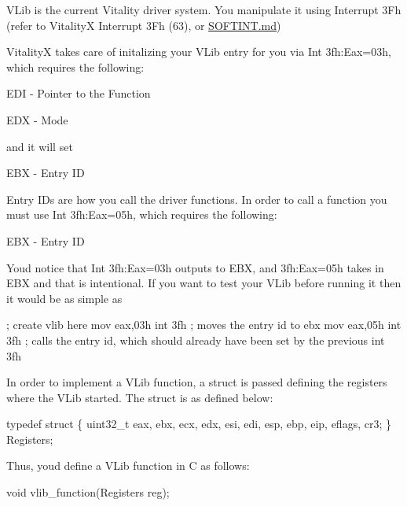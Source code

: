 V\+Lib is the current Vitality driver system. You manipulate it using Interrupt 3\+Fh (refer to VitalityX Interrupt 3\+Fh (63), or \hyperlink{a00008}{S\+O\+F\+T\+I\+N\+T.\+md})

VitalityX takes care of initalizing your V\+Lib entry for you via Int 3fh\+:Eax=03h, which requires the following\+:


\begin{DoxyItemize}
\item E\+DI -\/ Pointer to the Function
\item E\+DX -\/ Mode
\end{DoxyItemize}

and it will set


\begin{DoxyItemize}
\item E\+BX -\/ Entry ID
\end{DoxyItemize}

Entry ID\textquotesingle{}s are how you call the driver functions. In order to call a function you must use Int 3fh\+:Eax=05h, which requires the following\+:


\begin{DoxyItemize}
\item E\+BX -\/ Entry ID
\end{DoxyItemize}

You\textquotesingle{}d notice that Int 3fh\+:Eax=03h outputs to E\+BX, and 3fh\+:Eax=05h takes in E\+BX and that is intentional. If you want to test your V\+Lib before running it then it would be as simple as 
\begin{DoxyCode}
; create vlib here
mov eax,03h
int 3fh ; moves the entry id to ebx
mov eax,05h
int 3fh ; calls the entry id, which should already have been set by the previous int 3fh
\end{DoxyCode}


In order to implement a V\+Lib function, a struct is passed defining the registers where the V\+Lib started. The struct is as defined below\+:


\begin{DoxyCode}
typedef struct \{
    uint32\_t eax, ebx, ecx, edx, esi, edi, esp, ebp, eip, eflags, cr3;
\} Registers;
\end{DoxyCode}


Thus, youd define a V\+Lib function in C as follows\+: 
\begin{DoxyCode}
void vlib\_function(Registers reg);
\end{DoxyCode}
 